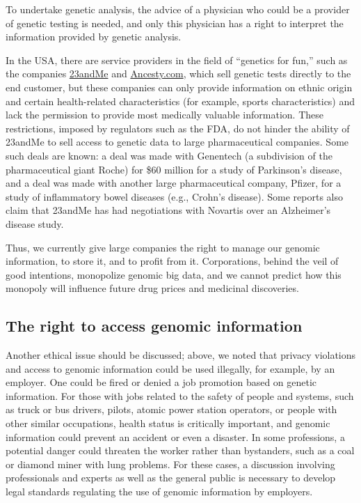 To undertake genetic analysis, the advice of a physician who could be a provider of genetic testing is needed, and only this physician has a right to interpret the information provided by genetic analysis.

In the USA, there are service providers in the field of “genetics for fun,” such as the companies \href{https://www.23andme.com}{23andMe} and \href{https://www.ancestry.com/}{Ancesty.com}, which sell genetic tests directly to the end customer, but these companies can only provide information on ethnic origin and certain health-related characteristics (for example, sports characteristics) and lack the permission to provide most medically valuable information. These restrictions, imposed by regulators such as the FDA, do not hinder the ability of 23andMe to sell access to genetic data to large pharmaceutical companies. Some such deals are known: a deal was made with Genentech (a subdivision of the pharmaceutical giant Roche) for \$60 million\cite{forbes:genentech} for a study of Parkinson’s disease, and a deal was made with another large pharmaceutical company, Pfizer, for a study of inflammatory bowel diseases (e.g., Crohn’s disease)\cite{genomeweb.com:23andme-pfizer}. Some reports also claim that 23andMe has had negotiations with Novartis over an Alzheimer’s disease study\cite{alzforum.org:23andme-alzheimers}.

Thus, we currently give large companies the right to manage our genomic information, to store it, and to profit from it. Corporations, behind the veil of good intentions, monopolize genomic big data, and we cannot predict how this monopoly will influence future drug prices and medicinal discoveries.

\subsection{The right to access genomic information}

Another ethical issue should be discussed; above, we noted that privacy violations and access to genomic information could be used illegally, for example, by an employer. One could be fired or denied a job promotion based on genetic information. For those with jobs related to the safety of people and systems, such as truck or bus drivers, pilots, atomic power station operators, or people with other similar occupations, health status is critically important, and genomic information could prevent an accident or even a disaster. In some professions, a potential danger could threaten the worker rather than bystanders, such as a coal or diamond miner with lung problems. For these cases, a discussion involving professionals and experts as well as the general public is necessary to develop legal standards regulating the use of genomic information by employers.
